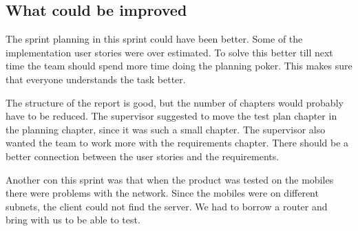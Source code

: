 \subsection{What could be improved}
The sprint planning in this sprint could have been better. Some of the implementation user stories were over estimated. To solve this better till next time the team should spend more time doing the planning poker. This makes sure that everyone understands the task better. 

The structure of the report is good, but the number of chapters would probably have to be reduced. The supervisor suggested to move the test plan chapter in the planning chapter, since it was such a small chapter. The supervisor also wanted the team to work more with the requirements chapter. There should be a better connection between the user stories and the requirements.


Another con this sprint was that when the product was tested on the mobiles there were problems with the network. Since the mobiles were on different subnets, the client could not find the server. We had to borrow a router and bring with us to be able to test. 

